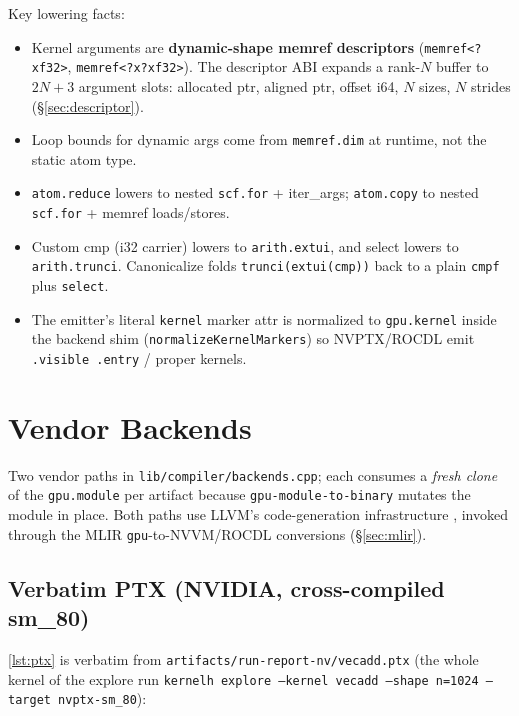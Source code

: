 \documentclass[10pt,twoside]{article}
\begin{document}
Key lowering facts:
\begin{itemize}
  \item Kernel arguments are \textbf{dynamic-shape memref descriptors}
        (\texttt{memref<?xf32>}, \texttt{memref<?x?xf32>}). The descriptor ABI expands a
        rank-$N$ buffer to $2N+3$ argument slots: allocated ptr, aligned ptr, offset i64, $N$
        sizes, $N$ strides (\S\ref{sec:descriptor}).
  \item Loop bounds for dynamic args come from \texttt{memref.dim} at runtime, not the static
        atom type.
  \item \texttt{atom.reduce} lowers to nested \texttt{scf.for} + iter\_args;
        \texttt{atom.copy} to nested \texttt{scf.for} + memref loads/stores.
  \item Custom cmp (i32 carrier) lowers to \texttt{arith.extui}, and select lowers to
        \texttt{arith.trunci}. Canonicalize folds \texttt{trunci(extui(cmp))} back to a
        plain \texttt{cmpf} plus \texttt{select}.
  \item The emitter's literal \texttt{kernel} marker attr is normalized to \texttt{gpu.kernel}
        inside the backend shim (\texttt{normalizeKernelMarkers}) so NVPTX/ROCDL emit
        \texttt{.visible .entry} / proper kernels.
\end{itemize}

\section{Vendor Backends}
\label{sec:backends}

Two vendor paths in \texttt{lib/compiler/backends.cpp}; each consumes a \emph{fresh clone} of
the \texttt{gpu.module} per artifact because \texttt{gpu-module-to-binary} mutates the module
in place. Both paths use LLVM's code-generation infrastructure \cite{llvm2004}, invoked
through the MLIR \texttt{gpu}-to-NVVM/ROCDL conversions (\S\ref{sec:mlir}).

\subsection{Verbatim PTX (NVIDIA, cross-compiled sm\_80)}
\label{sec:ptx}

\cref{lst:ptx} is verbatim from \texttt{artifacts/run-report-nv/vecadd.ptx} (the whole kernel
of the explore run \texttt{kernelh explore --kernel vecadd --shape n=1024 --target
nvptx-sm\_80}):
\end{document}
